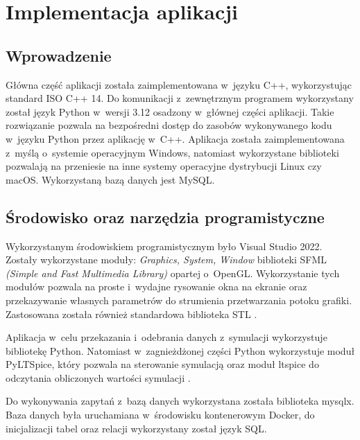 \documentclass[12pt, a4paper]{article} %
\begin{document}
\clearpage
\section{Implementacja aplikacji}

\subsection{Wprowadzenie} %
\aka Główna część aplikacji została zaimplementowana w~języku C++, wykorzystując standard ISO C++ 14. 
Do komunikacji z~zewnętrznym programem wykorzystany został język Python w~wersji 3.12 osadzony w~głównej części aplikacji. Takie rozwiązanie pozwala na bezpośredni dostęp do zasobów wykonywanego kodu w~języku Python przez aplikację w~C++. 
Aplikacja została zaimplementowana z~myślą o~systemie operacyjnym Windows, natomiast wykorzystane biblioteki pozwalają na przeniesie na inne systemy operacyjne dystrybucji Linux czy macOS. Wykorzystaną bazą danych jest MySQL.


\subsection{Środowisko oraz narzędzia programistyczne}
\aka Wykorzystanym środowiskiem programistycznym było Visual Studio 2022. Zostały wykorzystane moduły: \textit{Graphics, System, Window} biblioteki SFML \textit{(Simple and Fast Multimedia Library)} opartej o~OpenGL. Wykorzystanie tych modułów pozwala na proste i~wydajne rysowanie okna na ekranie oraz przekazywanie własnych parametrów do strumienia przetwarzania potoku grafiki. Zastosowana została również standardowa biblioteka STL \cite{sfml}. 

\aka Aplikacja w~celu przekazania i~odebrania danych z~symulacji wykorzystuje bibliotekę Python. Natomiast w~zagnieżdżonej części Python wykorzystuje moduł PyLTSpice, który pozwala na sterowanie symulacją \cite{pyltspice} oraz moduł ltspice do odczytania obliczonych wartości symulacji \cite{rawltspice}.

\aka Do wykonywania zapytań z~bazą danych wykorzystana została biblioteka mysqlx. Baza danych była uruchamiana w~środowisku kontenerowym Docker, do inicjalizacji tabel oraz relacji wykorzystany został język SQL. 
\end{document}
